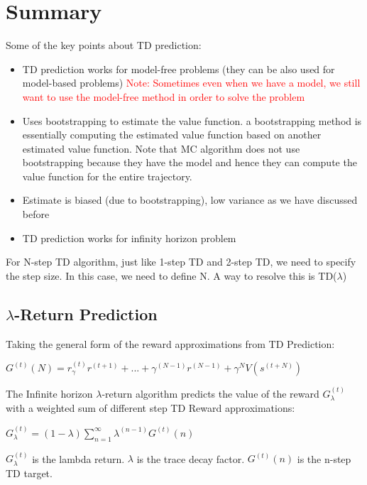 \documentclass[11pt]{article}
\begin{document}
\section{Summary}
Some of the key points about TD prediction:
\begin{itemize}
  \item TD prediction works for model-free problems (they can be also used for model-based problems) \textcolor{red}{Note: Sometimes even when we have a model, we still want to use the model-free method in order to solve the problem}
  \item Uses bootstrapping to estimate the value function. a bootstrapping method is essentially computing the estimated value function based on another estimated value function. Note that MC algorithm does not use bootstrapping because they have the model and hence they can compute the value function for the entire trajectory. 
  \item Estimate is biased (due to bootstrapping), low variance as we have discussed before
  \item TD prediction works for infinity horizon problem
\end{itemize}

For N-step TD algorithm, just like 1-step TD and 2-step TD,  we need to specify the step size. In this case, we need to define N. A way to resolve this is TD($\lambda$)
\subsection{$\lambda$-Return Prediction}

Taking the general form of the reward approximations from TD Prediction:
\begin{center}\begin{large}
    $G^{(t)}(N) = r^{(t)}_\gamma r^{(t+1)} + ... + \gamma^{(N-1)}r^{(N-1)} + \gamma^N V(s^{(t+N)})$
\end{large}\end{center}

The Infinite horizon $\lambda$-return algorithm predicts the value of the reward $G_{\lambda}^{(t)}$ with a weighted sum of different step TD Reward approximations:

\begin{center}\begin{large}
    $G_{\lambda}^{(t)} =  (1 - \lambda) \sum\limits_{n=1}^\infty \lambda^{(n-1)} G^{(t)}(n)$
\end{large}\end{center}
$G_{\lambda}^{(t)}$ is the lambda return. $\lambda$ is the trace decay factor. $G^{(t)}(n)$ is the n-step TD target.
\end{document}
